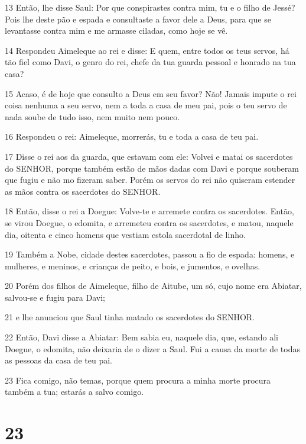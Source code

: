 \par 13 Então, lhe disse Saul: Por que conspirastes contra mim, tu e o filho de Jessé? Pois lhe deste pão e espada e consultaste a favor dele a Deus, para que se levantasse contra mim e me armasse ciladas, como hoje se vê.
\par 14 Respondeu Aimeleque ao rei e disse: E quem, entre todos os teus servos, há tão fiel como Davi, o genro do rei, chefe da tua guarda pessoal e honrado na tua casa?
\par 15 Acaso, é de hoje que consulto a Deus em seu favor? Não! Jamais impute o rei coisa nenhuma a seu servo, nem a toda a casa de meu pai, pois o teu servo de nada soube de tudo isso, nem muito nem pouco.
\par 16 Respondeu o rei: Aimeleque, morrerás, tu e toda a casa de teu pai.
\par 17 Disse o rei aos da guarda, que estavam com ele: Volvei e matai os sacerdotes do SENHOR, porque também estão de mãos dadas com Davi e porque souberam que fugiu e não mo fizeram saber. Porém os servos do rei não quiseram estender as mãos contra os sacerdotes do SENHOR.
\par 18 Então, disse o rei a Doegue: Volve-te e arremete contra os sacerdotes. Então, se virou Doegue, o edomita, e arremeteu contra os sacerdotes, e matou, naquele dia, oitenta e cinco homens que vestiam estola sacerdotal de linho.
\par 19 Também a Nobe, cidade destes sacerdotes, passou a fio de espada: homens, e mulheres, e meninos, e crianças de peito, e bois, e jumentos, e ovelhas.
\par 20 Porém dos filhos de Aimeleque, filho de Aitube, um só, cujo nome era Abiatar, salvou-se e fugiu para Davi;
\par 21 e lhe anunciou que Saul tinha matado os sacerdotes do SENHOR.
\par 22 Então, Davi disse a Abiatar: Bem sabia eu, naquele dia, que, estando ali Doegue, o edomita, não deixaria de o dizer a Saul. Fui a causa da morte de todas as pessoas da casa de teu pai.
\par 23 Fica comigo, não temas, porque quem procura a minha morte procura também a tua; estarás a salvo comigo.

\chapter{23}

